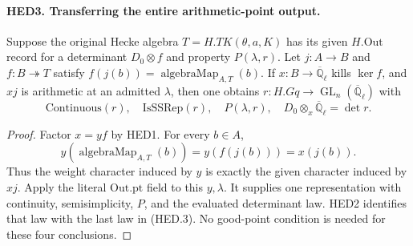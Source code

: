 \documentclass[11pt,a4paper]{article}
\numberwithin{equation}{section}
\theoremstyle{remark}\newtheorem{remark}[theorem]{Remark}
\begin{document}
\paragraph{HED3. Transferring the entire arithmetic-point output.}
\label{claim:HED3}
Suppose the original Hecke algebra \(T=H.TK(\theta,a,K)\) has its
given \(H.\mathrm{Out}\) record for a determinant \(D_0\otimes f\)
and property \(P(\lambda,r)\).  Let \(j:A\to B\) and
\(f:B\twoheadrightarrow T\) satisfy
\(f(j(b))=\operatorname{algebraMap}_{A,T}(b)\).
If \(x:B\to\overline{\mathbb Q}_\ell\) kills \(\ker f\), and
\(xj\) is arithmetic at an admitted \(\lambda\), then one obtains
\(r:H.Gq\to\operatorname{GL}_n(\overline{\mathbb Q}_\ell)\) with
\[
 \mathrm{Continuous}(r),\quad \mathrm{IsSSRep}(r),\quad
 P(\lambda,r),\quad D_0\otimes_x\overline{\mathbb Q}_\ell=\det r.
 \tag{HED.3}
\]
\begin{proof}
Factor \(x=yf\) by HED1.  For every \(b\in A\),
\[
 y(\operatorname{algebraMap}_{A,T}(b))=y(f(j(b)))=x(j(b)).
\]
Thus the weight character induced by \(y\) is exactly the given
character induced by \(xj\).  Apply the literal \(\mathrm{Out.pt}\)
field to this \(y,\lambda\).  It supplies one representation with
continuity, semisimplicity, \(P\), and the evaluated determinant law.
HED2 identifies that law with the last law in (HED.3).
No good-point condition is needed for these four conclusions.
\end{proof}

\end{document}
